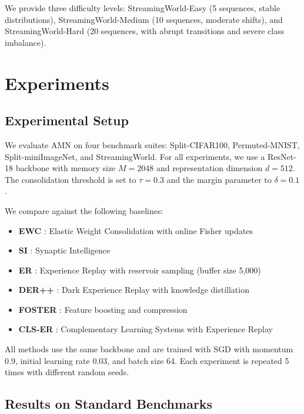 \documentclass[11pt]{article}
\begin{document}
We provide three difficulty levels: StreamingWorld-Easy (5 sequences, stable distributions), StreamingWorld-Medium (10 sequences, moderate shifts), and StreamingWorld-Hard (20 sequences, with abrupt transitions and severe class imbalance).

\section{Experiments}
\label{sec:experiments}

\subsection{Experimental Setup}

We evaluate AMN on four benchmark suites: Split-CIFAR100, Permuted-MNIST, Split-miniImageNet, and StreamingWorld. For all experiments, we use a ResNet-18 backbone with memory size $M = 2048$ and representation dimension $d = 512$. The consolidation threshold is set to $\tau = 0.3$ and the margin parameter to $\delta = 0.1$.

We compare against the following baselines:
\begin{itemize}
    \item \textbf{EWC} \citep{kirkpatrick2017overcoming}: Elastic Weight Consolidation with online Fisher updates
    \item \textbf{SI} \citep{zenke2017continual}: Synaptic Intelligence
    \item \textbf{ER} \citep{rolnick2019experience}: Experience Replay with reservoir sampling (buffer size 5,000)
    \item \textbf{DER++} \citep{buzzega2020dark}: Dark Experience Replay with knowledge distillation
    \item \textbf{FOSTER} \citep{wang2022foster}: Feature boosting and compression
    \item \textbf{CLS-ER} \citep{arani2022learning}: Complementary Learning Systems with Experience Replay
\end{itemize}

All methods use the same backbone and are trained with SGD with momentum 0.9, initial learning rate 0.03, and batch size 64. Each experiment is repeated 5 times with different random seeds.

\subsection{Results on Standard Benchmarks}
\end{document}
